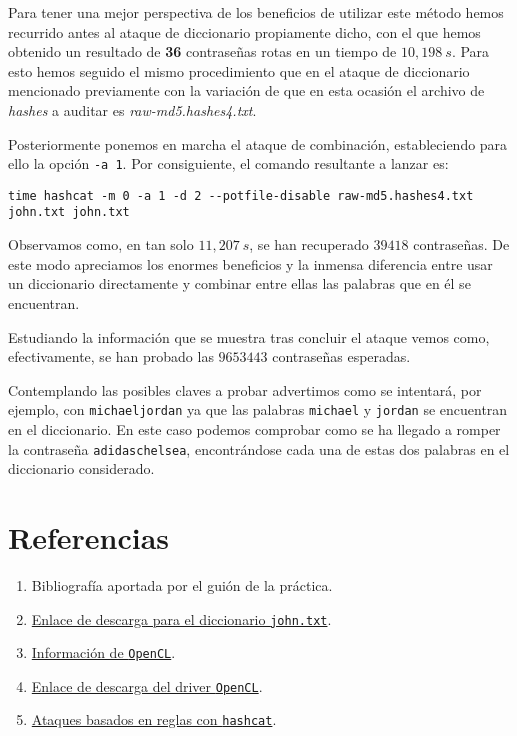 \documentclass{article}
\begin{document}
            Para tener una mejor perspectiva de los beneficios de utilizar este método hemos recurrido antes al ataque de diccionario propiamente dicho, con el que hemos obtenido un resultado de \textbf{36} contraseñas rotas en un tiempo de $10,198\ s$. Para esto hemos seguido el mismo procedimiento que en el ataque de diccionario mencionado previamente con la variación de que en esta ocasión el archivo de \textit{hashes} a auditar es \textit{raw-md5.hashes4.txt}.

            Posteriormente ponemos en marcha el ataque de combinación, estableciendo para ello la opción \texttt{-a 1}. Por consiguiente, el comando resultante a lanzar es:
            
            \begin{verbatim}
time hashcat -m 0 -a 1 -d 2 --potfile-disable raw-md5.hashes4.txt john.txt john.txt
            \end{verbatim}

            Observamos como, en tan solo $11,207\ s$, se han recuperado $39418$ contraseñas. De este modo apreciamos los enormes beneficios y la inmensa diferencia entre usar un diccionario directamente y combinar entre ellas las palabras que en él se encuentran.

            Estudiando la información que se muestra tras concluir el ataque vemos como, efectivamente, se han probado las $9653443$ contraseñas esperadas.

            Contemplando las posibles claves a probar advertimos como se intentará, por ejemplo, con \texttt{michaeljordan} ya que las palabras \texttt{michael} y \texttt{jordan} se encuentran en el diccionario. En este caso podemos comprobar como se ha llegado a romper la contraseña \texttt{adidaschelsea}, encontrándose cada una de estas dos palabras en el diccionario considerado.

    \section{Referencias}
        \begin{enumerate}
            \item Bibliografía aportada por el guión de la práctica.
            \item \href{https://wiki.skullsecurity.org/Passwords#Leaked_passwords}{Enlace de descarga para el diccionario \texttt{john.txt}}.
            \item \href{https://en.wikipedia.org/wiki/OpenCL}{Información de \texttt{OpenCL}}.
            \item \href{https://www.codeproject.com/Articles/1206656/OpenCL-Drivers-and-Runtimes-for-Intel-Architecture#latest_CPU_runtime}{Enlace de descarga del driver \texttt{OpenCL}}.
            \item \href{https://hashcat.net/wiki/doku.php?id=rule_based_attack}{Ataques basados en reglas con \texttt{hashcat}}.
        \end{enumerate}
\end{document}
